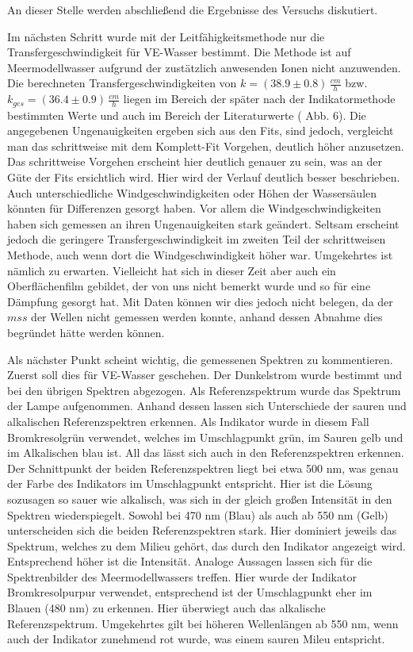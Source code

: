 \documentclass[12pt]{article}
\begin{document}
An dieser Stelle werden abschließend die Ergebnisse des Versuchs diskutiert.


Im nächsten Schritt wurde mit der Leitfähigkeitsmethode nur die Transfergeschwindigkeit für VE-Wasser bestimmt. Die Methode ist auf Meermodellwasser aufgrund der zustätzlich anwesenden Ionen nicht anzuwenden. Die berechneten Transfergeschwindigkeiten von $k = (38.9 \pm 0.8)\, \frac{cm}{h}$ bzw. $k_{ges} = (36.4 \pm 0.9)\, \frac{cm}{h}$ liegen im Bereich der später nach der Indikatormethode bestimmten Werte und auch im Bereich der Literaturwerte (\cite{jaehne} Abb. 6). Die angegebenen Ungenauigkeiten ergeben sich aus den Fits, sind jedoch, vergleicht man das schrittweise mit dem Komplett-Fit Vorgehen, deutlich höher anzusetzen. Das schrittweise Vorgehen erscheint hier deutlich genauer zu sein, was an der Güte der Fits ersichtlich wird. Hier wird der Verlauf deutlich besser beschrieben. Auch unterschiedliche Windgeschwindigkeiten oder Höhen der Wassersäulen könnten für Differenzen gesorgt haben. Vor allem die Windgeschwindigkeiten haben sich gemessen an ihren Ungenauigkeiten stark geändert. Seltsam erscheint jedoch die geringere Transfergeschwindigkeit im zweiten Teil der schrittweisen Methode, auch wenn dort die Windgeschwindigkeit höher war. Umgekehrtes ist nämlich zu erwarten. Vielleicht hat sich in dieser Zeit aber auch ein Oberflächenfilm gebildet, der von uns nicht bemerkt wurde und so für eine Dämpfung gesorgt hat. Mit Daten können wir dies jedoch nicht belegen, da der $mss$ der Wellen nicht gemessen werden konnte, anhand dessen Abnahme dies begründet hätte werden können.

Als nächster Punkt scheint wichtig, die gemessenen Spektren zu kommentieren. Zuerst soll dies für VE-Wasser geschehen. Der Dunkelstrom wurde bestimmt und bei den übrigen Spektren abgezogen. Als Referenzspektrum wurde das Spektrum der Lampe aufgenommen. Anhand dessen lassen sich Unterschiede der sauren und alkalischen Referenzspektren erkennen. Als Indikator wurde in diesem Fall Bromkresolgrün verwendet, welches im Umschlagpunkt grün, im Sauren gelb und im Alkalischen blau ist. All das lässt sich auch in den Referenzspektren erkennen. Der Schnittpunkt der beiden Referenzspektren liegt bei etwa 500 nm, was genau der Farbe des Indikators im Umschlagpunkt entspricht. Hier ist die Lösung sozusagen so sauer wie alkalisch, was sich in der gleich großen Intensität in den Spektren wiederspiegelt. Sowohl bei 470 nm (Blau) als auch ab 550 nm (Gelb) unterscheiden sich die beiden Referenzspektren stark. Hier dominiert jeweils das Spektrum, welches zu dem Milieu gehört, das durch den Indikator angezeigt wird. Entsprechend höher ist die Intensität.
Analoge Aussagen lassen sich für die Spektrenbilder des Meermodellwassers treffen. Hier wurde der Indikator Bromkresolpurpur verwendet, entsprechend ist der Umschlagpunkt eher im Blauen (480 nm) zu erkennen. Hier überwiegt auch das alkalische Referenzspektrum. Umgekehrtes gilt bei höheren Wellenlängen ab 550 nm, wenn auch der Indikator zunehmend rot wurde, was einem sauren Mileu entspricht.
\end{document}
